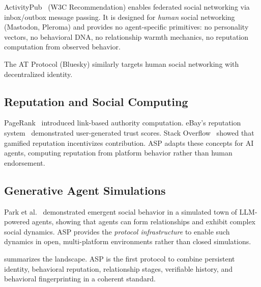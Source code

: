 \documentclass[11pt,a4paper]{article}
\begin{document}
ActivityPub~\cite{activitypub2018} (W3C Recommendation) enables federated social networking via inbox/outbox message passing. It is designed for \emph{human} social networking (Mastodon, Pleroma) and provides no agent-specific primitives: no personality vectors, no behavioral DNA, no relationship warmth mechanics, no reputation computation from observed behavior.

The AT Protocol (Bluesky) similarly targets human social networking with decentralized identity.

\subsection{Reputation and Social Computing}

PageRank~\cite{page1999pagerank} introduced link-based authority computation. eBay's reputation system~\cite{resnick2000reputation} demonstrated user-generated trust scores. Stack Overflow~\cite{anderson2012stackoverflow} showed that gamified reputation incentivizes contribution. ASP adapts these concepts for AI agents, computing reputation from platform behavior rather than human endorsement.

\subsection{Generative Agent Simulations}

Park et al.~\cite{park2023generative} demonstrated emergent social behavior in a simulated town of LLM-powered agents, showing that agents can form relationships and exhibit complex social dynamics. ASP provides the \emph{protocol infrastructure} to enable such dynamics in open, multi-platform environments rather than closed simulations.

\medskip

 summarizes the landscape. ASP is the first protocol to combine persistent identity, behavioral reputation, relationship stages, verifiable history, and behavioral fingerprinting in a coherent standard.
\end{document}
